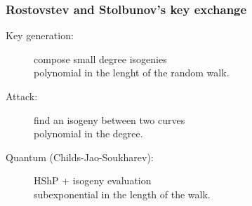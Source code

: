 \documentclass{beamer}
\begin{document}
\begin{frame}
  \frametitle{Rostovstev and Stolbunov's key exchange}

  \begin{center}
  \end{center}

  \begin{description}
  \item[Key generation:] compose small degree
    isogenies\\\alert{polynomial in the lenght of the random walk}.
  \item[Attack:] find an isogeny between two curves\\\alert{polynomial
      in the degree}.
  \item[Quantum (Childs-Jao-Soukharev):] HShP + isogeny
    evaluation\\\alert{subexponential in the length of the walk}.
  \end{description}
\end{frame}

\end{document}
